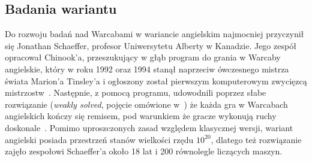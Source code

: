 \FloatBarrier

\subsection{Badania wariantu}

Do rozwoju badań nad Warcabami w wariancie angielskim najmocniej przyczynił się Jonathan Schaeffer, profesor Uniwersytetu Alberty w Kanadzie. Jego zespół opracował Chinook'a, przeszukujący w głąb program do grania w Warcaby angielskie, który w roku 1992 oraz 1994 stanął naprzeciw ówczesnego mistrza świata Marion'a Tinsley'a i ogłoszony został pierwszym komputerowym zwycięzcą mistrzostw~\cite{Chinook}. Następnie, z pomocą programu, udowodnili poprzez słabe rozwiązanie (\textit{weakly solved}, pojęcie omówione w~\cite{Solving}) że każda gra w Warcabach angielskich kończy się remisem, pod warunkiem że gracze wykonują ruchy doskonale~\cite{Solved}. Pomimo uproszczonych zasad względem klasycznej wersji, wariant angielski posiada przestrzeń stanów wielkości rzędu $10^{20}$, dlatego też rozwiązanie zajęło zespołowi Schaeffer'a około 18 lat i 200 równolegle liczących maszyn.



